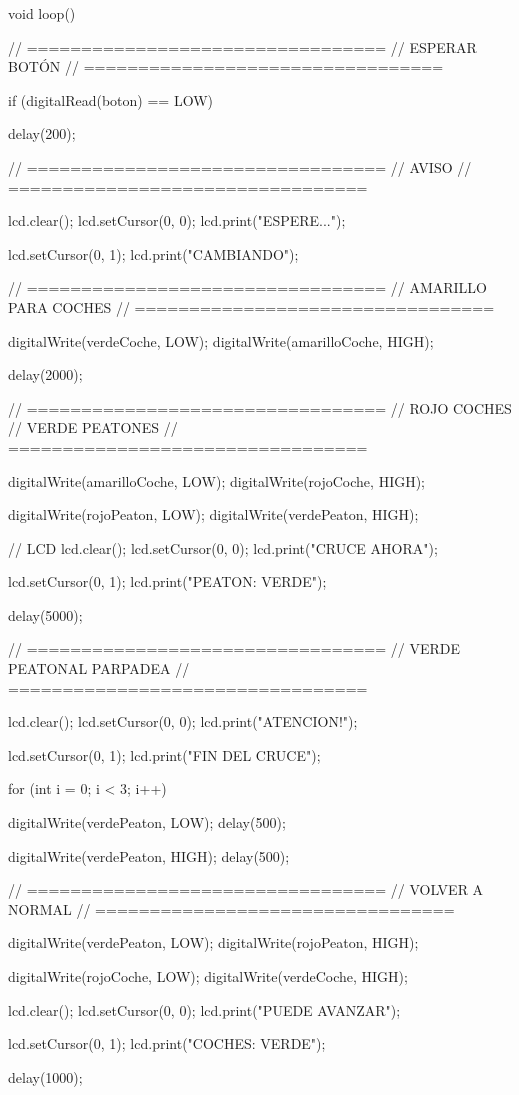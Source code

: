 void loop() {

  // =================================
  // ESPERAR BOTÓN
  // =================================

  if (digitalRead(boton) == LOW) {

    delay(200);

    // =================================
    // AVISO
    // =================================

    lcd.clear();
    lcd.setCursor(0, 0);
    lcd.print("ESPERE...");

    lcd.setCursor(0, 1);
    lcd.print("CAMBIANDO");

    // =================================
    // AMARILLO PARA COCHES
    // =================================

    digitalWrite(verdeCoche, LOW);
    digitalWrite(amarilloCoche, HIGH);

    delay(2000);

    // =================================
    // ROJO COCHES
    // VERDE PEATONES
    // =================================

    digitalWrite(amarilloCoche, LOW);
    digitalWrite(rojoCoche, HIGH);

    digitalWrite(rojoPeaton, LOW);
    digitalWrite(verdePeaton, HIGH);

    // LCD
    lcd.clear();
    lcd.setCursor(0, 0);
    lcd.print("CRUCE AHORA");

    lcd.setCursor(0, 1);
    lcd.print("PEATON: VERDE");

    delay(5000);

    // =================================
    // VERDE PEATONAL PARPADEA
    // =================================

    lcd.clear();
    lcd.setCursor(0, 0);
    lcd.print("ATENCION!");

    lcd.setCursor(0, 1);
    lcd.print("FIN DEL CRUCE");

    for (int i = 0; i < 3; i++) {

      digitalWrite(verdePeaton, LOW);
      delay(500);

      digitalWrite(verdePeaton, HIGH);
      delay(500);
    }

    // =================================
    // VOLVER A NORMAL
    // =================================

    digitalWrite(verdePeaton, LOW);
    digitalWrite(rojoPeaton, HIGH);

    digitalWrite(rojoCoche, LOW);
    digitalWrite(verdeCoche, HIGH);

    lcd.clear();
    lcd.setCursor(0, 0);
    lcd.print("PUEDE AVANZAR");

    lcd.setCursor(0, 1);
    lcd.print("COCHES: VERDE");

    delay(1000);
  }
}